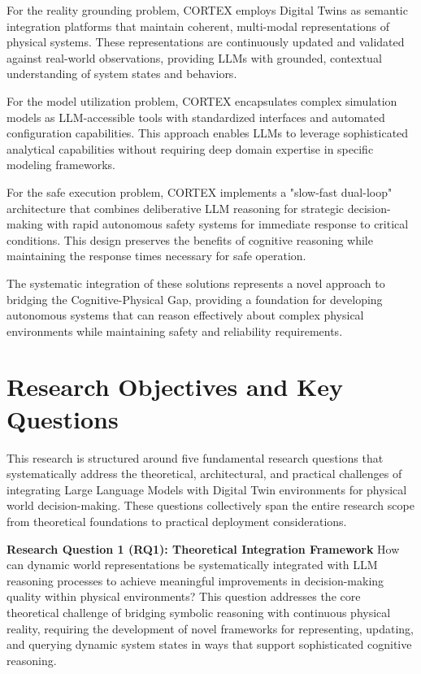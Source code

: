 For the reality grounding problem, CORTEX employs Digital Twins as semantic integration platforms that maintain coherent, multi-modal representations of physical systems. These representations are continuously updated and validated against real-world observations, providing LLMs with grounded, contextual understanding of system states and behaviors.

For the model utilization problem, CORTEX encapsulates complex simulation models as LLM-accessible tools with standardized interfaces and automated configuration capabilities. This approach enables LLMs to leverage sophisticated analytical capabilities without requiring deep domain expertise in specific modeling frameworks.

For the safe execution problem, CORTEX implements a "slow-fast dual-loop" architecture that combines deliberative LLM reasoning for strategic decision-making with rapid autonomous safety systems for immediate response to critical conditions. This design preserves the benefits of cognitive reasoning while maintaining the response times necessary for safe operation.

The systematic integration of these solutions represents a novel approach to bridging the Cognitive-Physical Gap, providing a foundation for developing autonomous systems that can reason effectively about complex physical environments while maintaining safety and reliability requirements.

\section{Research Objectives and Key Questions}

This research is structured around five fundamental research questions that systematically address the theoretical, architectural, and practical challenges of integrating Large Language Models with Digital Twin environments for physical world decision-making. These questions collectively span the entire research scope from theoretical foundations to practical deployment considerations.

\textbf{Research Question 1 (RQ1): Theoretical Integration Framework}
How can dynamic world representations be systematically integrated with LLM reasoning processes to achieve meaningful improvements in decision-making quality within physical environments? This question addresses the core theoretical challenge of bridging symbolic reasoning with continuous physical reality, requiring the development of novel frameworks for representing, updating, and querying dynamic system states in ways that support sophisticated cognitive reasoning.

